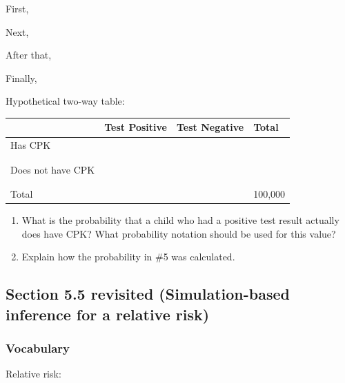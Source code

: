 \documentclass[
]{report}
\newcommand{\rgs}{\vspace{12pt}} %
\newcommand{\rgi}{\hspace{24pt}}  %
\begin{document}
\rgi First,
\rgs

\rgi Next,
\rgs

\rgi After that,
\rgs

\rgi Finally,
\rgs

\rgi Hypothetical two-way table:

\begin{center}
\begin{tabular}{|l|p{1.3in}|p{1.3in}|p{1.3in}|}
\hline
&   Test Positive   & Test Negative & Total \\ \hline
Has CPK     & & & \\
    & & & \\
    & & & \\ \hline
Does not have CPK       & & & \\
    & & & \\
    & & & \\ \hline
Total & & & 100,000 \\ \hline
\end{tabular}
\end{center}
\rgs

\begin{enumerate}
\def\labelenumi{\arabic{enumi}.}
\setcounter{enumi}{4}
\item
  What is the probability that a child who had a positive test result actually does have CPK? What probability notation should be used for this value?
  \rgs
\item
  Explain how the probability in \#5 was calculated.
\end{enumerate}

\newpage

\hypertarget{section-5.5-revisited-simulation-based-inference-for-a-relative-risk}{%
\subsection*{Section 5.5 revisited (Simulation-based inference for a relative risk)}\label{section-5.5-revisited-simulation-based-inference-for-a-relative-risk}}

\hypertarget{vocabulary-19}{%
\subsubsection*{Vocabulary}\label{vocabulary-19}}

Relative risk:
\rgs
\end{document}
